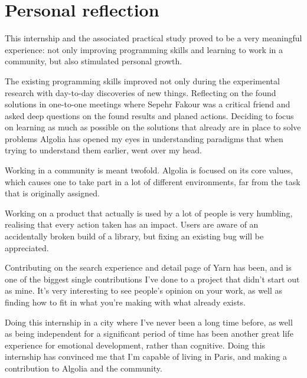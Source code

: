 \section{Personal reflection}

This internship and the associated practical study proved to be a very meaningful experience: not only improving programming skills and learning to work in a community, but also stimulated personal growth. 

The existing programming skills improved not only during the experimental research with day-to-day discoveries of new things. Reflecting on the found solutions in one-to-one meetings where Sepehr Fakour was a critical friend and asked  deep questions on the found results and planed actions. Deciding to focus on learning as much as possible on the solutions that already  are in place to solve problems Algolia has opened my eyes in understanding paradigms that when trying to understand them earlier, went over my head.

Working in a community is meant twofold. Algolia is focused on its  core values, which causes one to take part in a lot of different environments, far from the task that is originally assigned.

Working on a product that actually is used by a lot of people is very humbling, realising  that every action taken has an impact. Users are aware of an accidentally broken build of a library, but fixing an existing bug will be appreciated.

Contributing on the search experience and detail page of Yarn has been, and is one of the  biggest single contributions I’ve done to a project that didn't start out as mine. It’s very interesting to see people’s opinion on your work, as well as finding how to fit in what you’re making with  what already exists.

Doing this internship in a city where I’ve never been a long time before, as well as being independent for a significant period of time has been another great life experience for emotional development, rather than cognitive. Doing this internship has convinced me that I’m capable of living in Paris, and making a contribution to Algolia and the community.
